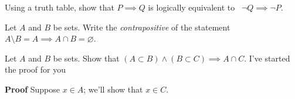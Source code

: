 \documentclass[12pt,fleqn]{exam}
\begin{document}
\begin{questions}


\question [10] Using a truth table, show that \mbox{\(P \implies Q\)} is logically equivalent to \mbox{ \(\lnot Q \implies \lnot P\)}.
\begin{solution}%

\end{solution}

\vfill
\newpage
 
 \question [10] Let $A$ and $B$ be sets. Write the \emph{contrapositive} of the statement $A \setminus B  = A \implies A \cap B = \varnothing$.
 

 \begin{solution}[2.50in]

\end{solution}

\question [10] Let $A$ and $B$ be sets. Show that $\left(A \subset B \right) \land \left(B \subset C \right)  \implies A \cap C$. I've started the proof for you

\textbf{Proof} Suppose $x \in A$; we'll show that $x \in C$.  



\vfill 

\end{questions}

\end{document}
